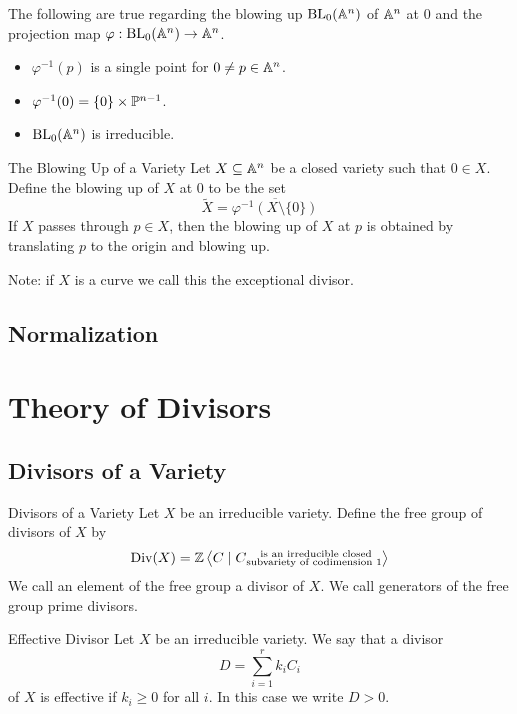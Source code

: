 \documentclass[a4paper]{article}
\begin{document}
\begin{prp}{}{} The following are true regarding the blowing up $\text{BL}_0(\mathbb{A}^n)$ of $\mathbb{A}^n$ at $0$ and the projection map $\varphi:\text{BL}_0(\mathbb{A}^n)\to\mathbb{A}^n$. 
\begin{itemize}
\item $\varphi^{-1}(p)$ is a single point for $0\neq p\in\mathbb{A}^n$. 
\item $\varphi^{-1}(0)=\{0\}\times\mathbb{P}^{n-1}$. 
\item $\text{BL}_0(\mathbb{A}^n)$ is irreducible. 
\end{itemize}
\end{prp}

\begin{defn}{The Blowing Up of a Variety}{} Let $X\subseteq\mathbb{A}^n$ be a closed variety such that $0\in X$. Define the blowing up of $X$ at $0$ to be the set $$\widetilde{X}=\overline{\varphi^{-1}(X\setminus\{0\})}$$ If $X$ passes through $p\in X$, then the blowing up of $X$ at $p$ is obtained by translating $p$ to the origin and blowing up. 
\end{defn}

Note: if $X$ is a curve we call this the exceptional divisor. 

\subsection{Normalization}

\pagebreak
\section{Theory of Divisors}
\subsection{Divisors of a Variety}
\begin{defn}{Divisors of a Variety}{} Let $X$ be an irreducible variety. Define the free group of divisors of $X$ by $$\text{Div}(X)=\mathbb{Z}\left\langle C\;|\;C\substack{\text{ is an irreducible closed}\\\text{subvariety of codimension }1}\right\rangle$$ We call an element of the free group a divisor of $X$. We call generators of the free group prime divisors. 
\end{defn}

\begin{defn}{Effective Divisor}{} Let $X$ be an irreducible variety. We say that a divisor $$D=\sum_{i=1}^rk_iC_i$$ of $X$ is effective if $k_i\geq 0$ for all $i$. In this case we write $D>0$. 
\end{defn}
\end{document}
